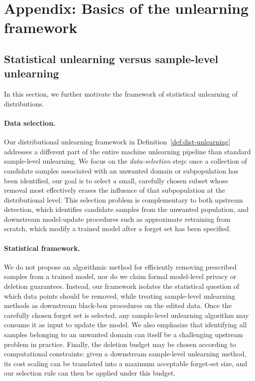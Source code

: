 \newpage
\appendix
\section{Appendix: Basics of the unlearning framework}
\label{app:proofs}

\subsection{Statistical unlearning versus sample-level unlearning}
In this section, we further motivate the framework of statistical unlearning of distributions. 
\paragraph{Data selection.} Our distributional unlearning framework in Definition~\ref{def:dist-unlearning} addresses a different part of the entire machine unlearning pipeline than standard sample-level unlearning. We focus on the \emph{data-selection} step: once a collection of candidate samples associated with an unwanted domain or subpopulation has been identified, our goal is to select a small, carefully chosen subset whose removal most effectively erases the influence of that subpopulation at the distributional level. This selection problem is complementary to both upstream detection, which identifies candidate samples from the unwanted population, and downstream model-update procedures such as approximate retraining from scratch, which modify a trained model after a forget set has been specified. 

\paragraph{Statistical framework. } We do not propose an algorithmic method for efficiently removing prescribed samples from a trained model, nor do we claim formal model-level privacy or deletion guarantees. Instead, our framework isolates the statistical question of which data points should be removed, while treating sample-level unlearning methods as downstream black-box procedures on the edited data. Once the carefully chosen forget set is selected, any sample-level unlearning algorithm may consume it as input to update the model. We also emphasize that identifying all samples belonging to an unwanted domain can itself be a challenging upstream problem in practice. Finally, the deletion budget may be chosen according to computational constraints: given a downstream sample-level unlearning method, its cost scaling can be translated into a maximum acceptable forget-set size, and our selection rule can then be applied under this budget.


